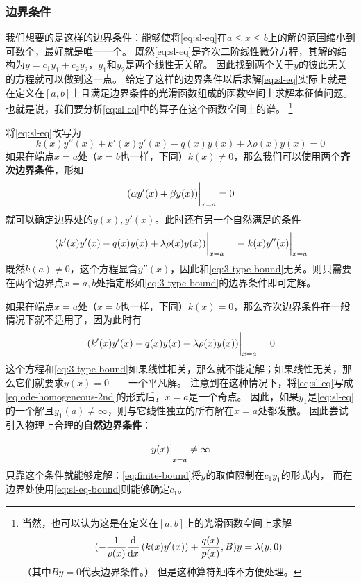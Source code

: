 \documentclass[UTF8]{ctexart}
\begin{document}
\subsubsection{边界条件} 
我们想要的是这样的边界条件：能够使将\eqref{eq:sl-eq}在$a \leq x \leq b$上的解的范围缩小到可数个，最好就是唯一一个。
既然\eqref{eq:sl-eq}是齐次二阶线性微分方程，其解的结构为$y=c_1 y_1 + c_2 y_2$，$y_1$和$y_2$是两个线性无关解。
因此找到两个关于$y$的彼此无关的方程就可以做到这一点。
给定了这样的边界条件以后求解\eqref{eq:sl-eq}实际上就是在定义在$[a, b]$上且满足边界条件的光滑函数组成的函数空间上求解本征值问题。也就是说，我们要分析\eqref{eq:sl-eq}中的算子在这个函数空间上的谱。%
\footnote{
    当然，也可以认为这是在定义在$[a, b]$上的光滑函数空间上求解
    \[
        (-\frac{1}{\rho(x)} \dv{x} \left(k(x) y'(x)\right) + \frac{q(x)}{p(x)}, B) y = \lambda (y, 0)
    \]
    （其中$By=0$代表边界条件。）
    但是这种算符矩阵不方便处理。%
}

将\eqref{eq:sl-eq}改写为
\[
    k(x) y''(x) + k'(x) y'(x) - q(x) y(x) + \lambda \rho(x) y(x) = 0
\]
如果在端点$x=a$处（$x=b$也一样，下同）$k(x) \neq 0$，那么我们可以使用两个\textbf{齐次边界条件}，形如
\begin{equation}
    \eval{(\alpha y'(x) + \beta y(x))}_{x=a} = 0
    \label{eq:3-type-bound}
\end{equation}
就可以确定边界处的$y(x), y'(x)$。此时还有另一个自然满足的条件
\[
    \eval{(k'(x) y'(x) - q(x) y(x) + \lambda \rho(x) y(x))}_{x=a} = -\eval{k(x) y''(x)}_{x=a}
\]
既然$k(a) \neq 0$，这个方程显含$y''(x)$，因此和\eqref{eq:3-type-bound}无关。则只需要在两个边界点$x=a, b$处指定形如\eqref{eq:3-type-bound}的边界条件即可定解。

如果在端点$x=a$处（$x=b$也一样，下同）$k(x) = 0$，那么齐次边界条件在一般情况下就不适用了，因为此时有
\begin{equation}
    \eval{(k'(x) y'(x) - q(x) y(x) + \lambda \rho(x) y(x))}_{x=a} = 0
    \label{eq:sl-eq-bound}
\end{equation}
这个方程和\eqref{eq:3-type-bound}如果线性相关，那么就不能定解；如果线性无关，那么它们就要求$y(x)=0$——一个平凡解。
注意到在这种情况下，将\eqref{eq:sl-eq}写成\eqref{eq:ode-homogeneous-2nd}的形式后，$x=a$是一个奇点。
因此，如果$y_1$是\eqref{eq:sl-eq}的一个解且$y_1(a)\neq \infty$，则与它线性独立的所有解在$x=a$处都发散。
因此尝试引入物理上合理的\textbf{自然边界条件}：
\begin{equation}
    \eval{y(x)}_{x=a} \neq \infty
    \label{eq:finite-bound}
\end{equation}
只靠这个条件就能够定解：\eqref{eq:finite-bound}将$y$的取值限制在$c_1 y_1$的形式内，
而在边界处使用\eqref{eq:sl-eq-bound}则能够确定$c_1$。
\end{document}
